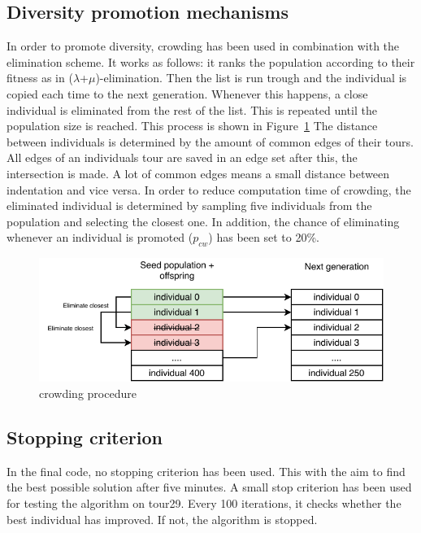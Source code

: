 \documentclass[a4paper,10pt]{article}
\newcommand{\ReplaceMe}[1]{{\color{blue}#1}}
\begin{document}
\subsection{Diversity promotion mechanisms}\label{ssec:diversitypromotion}

In order to promote diversity, crowding has been used in combination with the elimination scheme. It works as follows: it ranks the population according to their fitness as in ($\lambda$+$\mu$)-elimination. Then the list is run trough and the individual is copied each time to the next generation. Whenever this happens, a close individual is eliminated from the rest of the list. This is repeated until the population size is reached. This process is shown in Figure~\ref{fig:crowding}
The distance between individuals is determined by the amount of common edges of their tours. All edges of an individuals tour are saved in an edge set after this, the intersection is made. A lot of common edges means a small distance between indentation and vice versa. 
In order to reduce computation time of crowding, the eliminated individual is determined by sampling five individuals from the population and selecting the closest one. In addition, the chance of eliminating whenever an individual is promoted ($p_{cw}$) has been set to 20\%.

\begin{figure}[H]
  \centering
  \includegraphics[width=.5\textwidth]{img/crowding.pdf}
  \caption{crowding procedure}
  \label{fig:crowding}
\end{figure}
\subsection{Stopping criterion}\label{ssec:stopcriterion}

In the final code, no stopping criterion has been used. This with the aim to find the best possible solution after five minutes. A small stop criterion has been used for testing the algorithm on tour29. Every 100 iterations, it checks whether the best individual has improved. If not, the algorithm is stopped.
\end{document}
